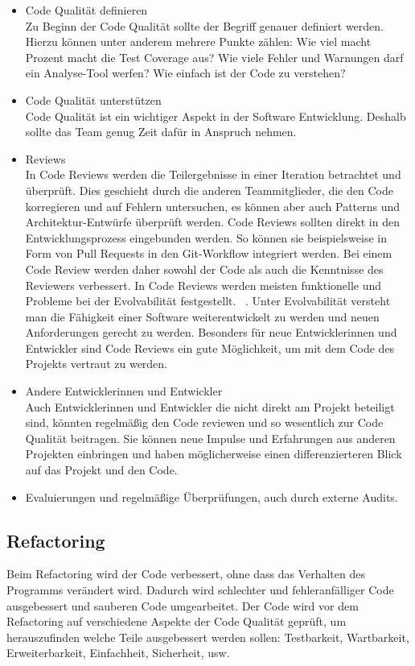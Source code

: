 \begin{itemize} 
\item Code Qualität definieren \\
Zu Beginn der Code Qualität sollte der Begriff genauer definiert werden. Hierzu können unter anderem mehrere Punkte zählen: Wie viel macht Prozent macht die Test Coverage aus? Wie viele Fehler und Warnungen darf ein Analyse-Tool werfen? Wie einfach ist der Code zu verstehen? 
\item Code Qualität unterstützen \\
Code Qualität ist ein wichtiger Aspekt in der Software Entwicklung. Deshalb sollte das Team genug Zeit dafür in Anspruch nehmen.
\item Reviews \\
In Code Reviews werden die Teilergebnisse in einer Iteration betrachtet und überprüft. Dies geschieht durch die anderen Teammitglieder, die den Code korregieren und auf Fehlern untersuchen, es können aber auch Patterns und Architektur-Entwürfe überprüft werden. Code Reviews sollten direkt in den Entwicklungsprozess eingebunden werden. So können sie beispielsweise in Form von Pull Requests in den Git-Workflow integriert werden. Bei einem Code Review werden daher sowohl der Code als auch die Kenntnisse des Reviewers verbessert. 
In Code Reviews werden meisten funktionelle und Probleme bei der Evolvabilität festgestellt. ~\parencite{mantyla2008types}. Unter Evolvabilität versteht man die Fähigkeit einer Software weiterentwickelt zu werden und neuen Anforderungen gerecht zu werden. Besonders für neue Entwicklerinnen und Entwickler sind Code Reviews ein gute Möglichkeit, um mit dem Code des Projekts vertraut zu werden.
\item Andere Entwicklerinnen und Entwickler \\
Auch Entwicklerinnen und Entwickler die nicht direkt am Projekt beteiligt sind, könnten regelmäßig den Code reviewen und so wesentlich zur Code Qualität beitragen. Sie können neue Impulse und Erfahrungen aus anderen Projekten einbringen und haben möglicherweise einen differenzierteren Blick auf das Projekt und den Code. 
\item Evaluierungen und regelmäßige Überprüfungen, auch durch externe Audits. 
\end{itemize}
\subsection{Refactoring}
Beim Refactoring wird der Code verbessert, ohne dass das Verhalten des Programms verändert wird. Dadurch wird schlechter und fehleranfälliger Code ausgebessert und sauberen Code umgearbeitet. Der Code wird vor dem Refactoring auf verschiedene Aspekte der Code Qualität geprüft, um herauszufinden welche Teile ausgebessert werden sollen: Testbarkeit, Wartbarkeit, Erweiterbarkeit, Einfachheit, Sicherheit, usw.  ~\parencite{fowler2018refactoring} 
